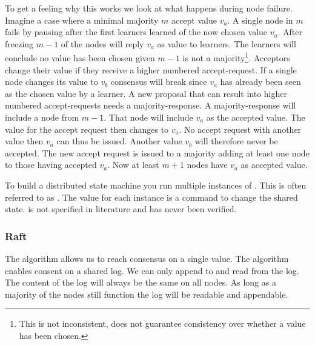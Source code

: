
To get a feeling why this works we look at what happens during node failure. Imagine a case where a minimal majority $m$ accept value $v_a$. A single node in $m$ fails by pausing after the first learners learned of the now chosen value $v_a$. After freezing $m-1$ of the nodes will reply $v_a$ as value to learners. The learners will conclude no value has been chosen given $m-1$ is not a majority\footnote{This is not inconsistent, \paxos{} does not guarantee consistency over whether a value has been chosen.}. Acceptors change their value if they receive a higher numbered accept-request. If a single node changes its value to $v_b$ consensus will break since $v_a$ has already been seen as the chosen value by a learner. A new proposal that can result into higher numbered accept-requests needs a majority-response. A majority-response will include a node from $m-1$. That node will include $v_a$ as the accepted value. The value for the accept request then changes to $v_a$. No accept request with another value then $v_a$ can thus be issued. Another value $v_b$ will therefore never be accepted. The new accept request is issued to a majority adding at least one node to those having accepted $v_a$. Now at least $m+1$ nodes have $v_a$ as accepted value.

To build a distributed state machine you run multiple instances of \paxos{}. This is often referred to as \multipaxos{}. The value for each instance is a command to change the shared state. \multipaxos{} is not specified in literature and has never been verified.

\subsubsection*{Raft} \label{sec:raft}
The \paxos{} algorithm allows us to reach consensus on a single value. The \raft{} algorithm enables consent on a shared log. We can only append to and read from the log. The content of the log will always be the same on all nodes. As long as a majority of the nodes still function the log will be readable and appendable.

